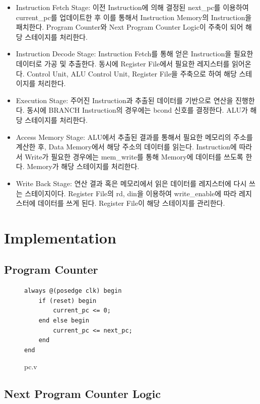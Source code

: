 \documentclass[openright, a4paper]{article}
\begin{document}
\begin{itemize}
    \item Instruction Fetch Stage: 이전 Instruction에 의해 결정된 next_pc를 이용하여 current_pc를 업데이트한 후 이를 통해서 Instruction Memory의 Instruction을 패치한다. Program Counter와 Next Program Counter Logic이 주축이 되어 해당 스테이지를 처리한다.
    \item Instruction Decode Stage: Instruction Fetch를 통해 얻은 Instruction을 필요한 데이터로 가공 및 추출한다. 동시에 Register File에서 필요한 레지스터를 읽어온다. Control Unit, ALU Control Unit, Register File을 주축으로 하여 해당 스테이지를 처리한다.
    \item Execution Stage: 주어진 Instruction과 추출된 데이터를 기반으로 연산을 진행한다. 동시에 BRANCH Instruction의 경우에는 bcond 신호를 결정한다. ALU가 해당 스테이지를 처리한다.
    \item Access Memory Stage: ALU에서 추출된 결과를 통해서 필요한 메모리의 주소를 계산한 후, Data Memory에서 해당 주소의 데이터를 읽는다. Instruction에 따라서 Write가 필요한 경우에는 mem_write를 통해 Memory에 데이터를 쓰도록 한다. Memory가 해당 스테이지를 처리한다.
    \item Write Back Stage: 연산 결과 혹은 메모리에서 읽은 데이터를 레지스터에 다시 쓰는 스테이지이다. Register File의 rd, din을 이용하여 write_enable에 따라 레지스터에 데이터를 쓰게 된다. Register File이 해당 스테이지를 관리한다.
\end{itemize}

\section{Implementation}

\subsection{Program Counter}

\begin{figure}[h]
    \begin{verbatim}
always @(posedge clk) begin
    if (reset) begin
        current_pc <= 0;
    end else begin
        current_pc <= next_pc;
    end
end
    \end{verbatim}
    \caption{pc.v}
\end{figure}

\subsection{Next Program Counter Logic}
\end{document}
